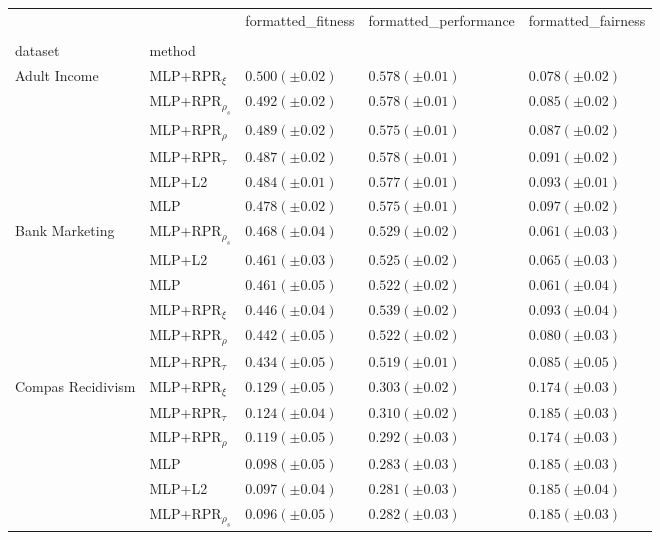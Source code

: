 \begin{tabular}{lllll}
\toprule
 &  & formatted_fitness & formatted_performance & formatted_fairness \\
 &  &  &  &  \\
dataset & method &  &  &  \\
\midrule
\multirow[t]{6}{*}{Adult Income} & MLP+RPR$_{\xi}$ & $0.500 (\pm0.02)$ & $0.578 (\pm0.01)$ & $0.078 (\pm0.02)$ \\
 & MLP+RPR$_{\rho_s}$ & $0.492 (\pm0.02)$ & $0.578 (\pm0.01)$ & $0.085 (\pm0.02)$ \\
 & MLP+RPR$_{\rho}$ & $0.489 (\pm0.02)$ & $0.575 (\pm0.01)$ & $0.087 (\pm0.02)$ \\
 & MLP+RPR$_{\tau}$ & $0.487 (\pm0.02)$ & $0.578 (\pm0.01)$ & $0.091 (\pm0.02)$ \\
 & MLP+L2 & $0.484 (\pm0.01)$ & $0.577 (\pm0.01)$ & $0.093 (\pm0.01)$ \\
 & MLP & $0.478 (\pm0.02)$ & $0.575 (\pm0.01)$ & $0.097 (\pm0.02)$ \\
\cline{1-5}
\multirow[t]{6}{*}{Bank Marketing} & MLP+RPR$_{\rho_s}$ & $0.468 (\pm0.04)$ & $0.529 (\pm0.02)$ & $0.061 (\pm0.03)$ \\
 & MLP+L2 & $0.461 (\pm0.03)$ & $0.525 (\pm0.02)$ & $0.065 (\pm0.03)$ \\
 & MLP & $0.461 (\pm0.05)$ & $0.522 (\pm0.02)$ & $0.061 (\pm0.04)$ \\
 & MLP+RPR$_{\xi}$ & $0.446 (\pm0.04)$ & $0.539 (\pm0.02)$ & $0.093 (\pm0.04)$ \\
 & MLP+RPR$_{\rho}$ & $0.442 (\pm0.05)$ & $0.522 (\pm0.02)$ & $0.080 (\pm0.03)$ \\
 & MLP+RPR$_{\tau}$ & $0.434 (\pm0.05)$ & $0.519 (\pm0.01)$ & $0.085 (\pm0.05)$ \\
\cline{1-5}
\multirow[t]{6}{*}{Compas Recidivism} & MLP+RPR$_{\xi}$ & $0.129 (\pm0.05)$ & $0.303 (\pm0.02)$ & $0.174 (\pm0.03)$ \\
 & MLP+RPR$_{\tau}$ & $0.124 (\pm0.04)$ & $0.310 (\pm0.02)$ & $0.185 (\pm0.03)$ \\
 & MLP+RPR$_{\rho}$ & $0.119 (\pm0.05)$ & $0.292 (\pm0.03)$ & $0.174 (\pm0.03)$ \\
 & MLP & $0.098 (\pm0.05)$ & $0.283 (\pm0.03)$ & $0.185 (\pm0.03)$ \\
 & MLP+L2 & $0.097 (\pm0.04)$ & $0.281 (\pm0.03)$ & $0.185 (\pm0.04)$ \\
 & MLP+RPR$_{\rho_s}$ & $0.096 (\pm0.05)$ & $0.282 (\pm0.03)$ & $0.185 (\pm0.03)$ \\
\cline{1-5}

\end{tabular}
